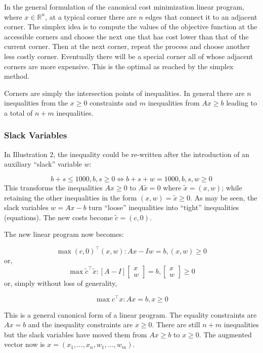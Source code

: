 \documentclass[11pt,]{article}
\begin{document}
In the general formulation of the canonical cost minimization linear
program, where \(x\in \mathbb{R}^n\), at a typical corner there are
\(n\) edges that connect it to an adjacent corner. The simplex idea is
to compute the values of the objective function at the accessible
corners and choose the next one that has cost lower than that of the
current corner. Then at the next corner, repeat the process and choose
another less costly corner. Eventually there will be a special corner
all of whose adjacent corners are more expensive. This is the optimal as
reached by the simplex method.

Corners are simply the intersection points of inequalities. In general
there are \(n\) inequalities from the \(x \geq 0\) constraints and \(m\)
inequalities from \(Ax\geq b\) leading to a total of \(n+m\)
inequalities.

\subsubsection{Slack Variables}\label{slack-variables}

In Illustration 2, the inequality could be re-written after the
introduction of an auxiliary ``slack'' variable \(w\):

\[
b+s\leq 1000, b, s\geq 0 \iff b+s+w = 1000, b, s, w\geq 0
\] This transforms the inequalities \(Ax\geq 0\) to \(A\tilde{x} = 0\)
where \(\tilde{x} = (x, w)\); while retaining the other inequalities in
the form \((x, w) = \tilde{x}\geq 0\). As may be seen, the slack
variables \(w = Ax-b\) turn ``loose'' inequalities into ``tight''
inequalities (equations). The new costs become \(\tilde{c} = (c, 0)\).

The new linear program now becomes:

\[
\max  (c, 0)^{\top}(x,w): Ax - Iw = b, (x, w) \geq 0 
\] or, \[
\max \tilde{c}^{\top}\tilde{x}: [A -I]\begin{bmatrix}x\\w\end{bmatrix} = b, 
\begin{bmatrix}x\\w\end{bmatrix} \geq 0
\] or, simply without loss of generality,

\[
\max c^{\top}x: Ax = b, x \geq 0
\]

This is a general canonical form of a linear program. The equality
constraints are \(Ax=b\) and the inequality constraints are \(x\geq 0\).
There are still \(n+m\) inequalities but the slack variables have moved
them from \(Ax\geq b\) to \(x\geq 0\). The augmented vector now is
\(x = (x_1,\hdots, x_n, w_1, \hdots, w_m)\).
\end{document}
